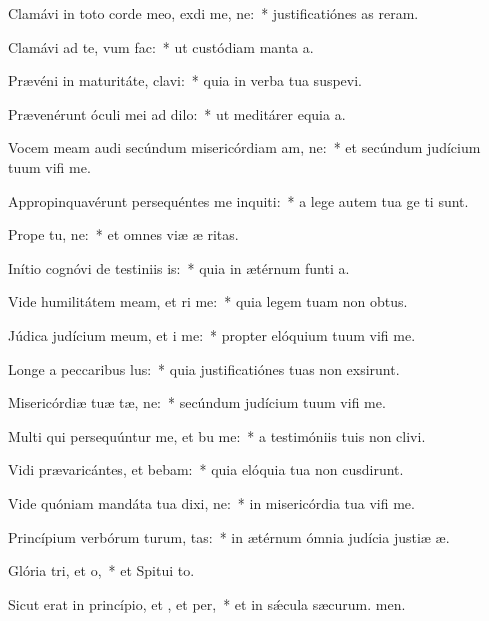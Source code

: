 \item Clamávi in toto corde meo, exdi me, ne:~* justificatiónes as reram.
\item Clamávi ad te, vum  fac:~* ut custódiam manta a.
\item Prævéni in maturitáte,  clavi:~* quia in verba tua suspevi.
\item Prævenérunt óculi mei ad  dilo:~* ut meditárer equia a.
\item Vocem meam audi secúndum misericórdiam am, ne:~* et secúndum judícium tuum vifi me.
\item Appropinquavérunt persequéntes me inquiti:~* a lege autem tua ge ti sunt.
\item Prope  tu, ne:~* et omnes viæ æ ritas.
\item Inítio cognóvi de testiniis is:~* quia in ætérnum funti a.
\item Vide humilitátem meam, et ri me:~* quia legem tuam non  obtus.
\item Júdica judícium meum, et i me:~* propter elóquium tuum vifi me.
\item Longe a peccaribus lus:~* quia justificatiónes tuas non exsirunt.
\item Misericórdiæ tuæ tæ, ne:~* secúndum judícium tuum vifi me.
\item Multi qui persequúntur me, et bu me:~* a testimóniis tuis non clivi.
\item Vidi prævaricántes, et bebam:~* quia elóquia tua non cusdirunt.
\item Vide quóniam mandáta tua dixi, ne:~* in misericórdia tua vifi me.
\item Princípium verbórum turum, tas:~* in ætérnum ómnia judícia justiæ æ.
\item Glória tri, et o,~* et Spitui to.
\item Sicut erat in princípio, et , et per,~* et in sǽcula sæcurum. men.
